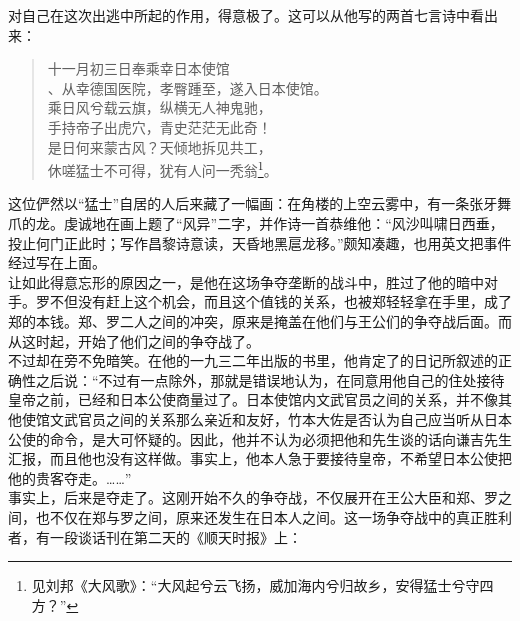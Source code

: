 对自己在这次出逃中所起的作用，得意极了。这可以从他写的两首七言诗中看出来：\\

\begin{quote}
	十一月初三日奉乘幸日本使馆\\

、从幸德国医院，孝臀踵至，遂入日本使馆。\\

乘日风兮载云旗，纵横无人神鬼驰，\\

手持帝子出虎穴，青史茫茫无此奇！\\

是日何来蒙古风？天倾地拆见共工，\\

休嗟猛士不可得，犹有人问一秃翁\footnote{见刘邦《大风歌》：“大风起兮云飞扬，威加海内兮归故乡，安得猛士兮守四方？”}。\\
\end{quote}

这位俨然以“猛士”自居的人后来藏了一幅画：在角楼的上空云雾中，有一条张牙舞爪的龙。虔诚地在画上题了“风异”二字，并作诗一首恭维他：“风沙叫啸日西垂，投止何门正此时；写作昌黎诗意读，天昏地黑扈龙移。”颇知凑趣，也用英文把事件经过写在上面。\\

让如此得意忘形的原因之一，是他在这场争夺垄断的战斗中，胜过了他的暗中对手。罗不但没有赶上这个机会，而且这个值钱的关系，也被郑轻轻拿在手里，成了郑的本钱。郑、罗二人之间的冲突，原来是掩盖在他们与王公们的争夺战后面。而从这时起，开始了他们之间的争夺战了。\\

不过却在旁不免暗笑。在他的一九三二年出版的书里，他肯定了的日记所叙述的正确性之后说：“不过有一点除外，那就是错误地认为，在同意用他自己的住处接待皇帝之前，已经和日本公使商量过了。日本使馆内文武官员之间的关系，并不像其他使馆文武官员之间的关系那么亲近和友好，竹本大佐是否认为自己应当听从日本公使的命令，是大可怀疑的。因此，他并不认为必须把他和先生谈的话向谦吉先生汇报，而且他也没有这样做。事实上，他本人急于要接待皇帝，不希望日本公使把他的贵客夺走。……”\\

事实上，后来是夺走了。这刚开始不久的争夺战，不仅展开在王公大臣和郑、罗之间，也不仅在郑与罗之间，原来还发生在日本人之间。这一场争夺战中的真正胜利者，有一段谈话刊在第二天的《顺天时报》上：\\

